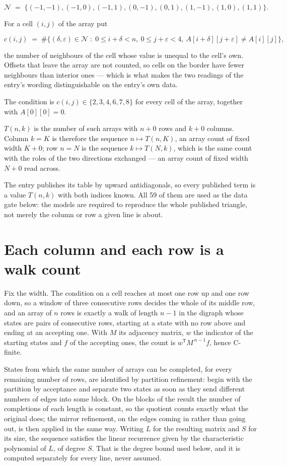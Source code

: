 \documentclass[11pt]{article}
\theoremstyle{definition}
\begin{document}
\[\mathcal{N} \;=\; \{(-1,-1), (-1,0), (-1,1), (0,-1), (0,1), (1,-1), (1,0), (1,1)\}.\]

For a cell $(i,j)$ of the array put

\[c(i,j) \;=\; \#\bigl\{(\delta,\varepsilon)\in\mathcal{N} \;:\; 0\le i+\delta<n,\ 0\le j+\varepsilon<4,\ A[i+\delta][j+\varepsilon] \neq A[i][j]\bigr\},\]

the number of neighbours of the cell whose value is unequal to the cell's own. Offsets that leave the array are not counted, so cells on the border have fewer neighbours than interior ones --- which is what makes the two readings of the entry's wording distinguishable on the entry's own data.

The condition is $c(i,j) \in \{2, 3, 4, 6, 7, 8\}$ for every cell of the array, together with $A[0][0]=0$.

$T(n,k)$ is the number of such arrays with $n + 0$ rows and $k + 0$ columns. Column $k = K$ is therefore the sequence $n \mapsto T(n,K)$, an array count of fixed width $K + 0$; row $n = N$ is the sequence $k \mapsto T(N,k)$, which is the same count with the roles of the two directions exchanged --- an array count of fixed width $N + 0$ read across.

The entry publishes its table by upward antidiagonals, so every published term is a value $T(n,k)$ with both indices known. All 59 of them are used as the data gate below: the models are required to reproduce the whole published triangle, not merely the column or row a given line is about.

\section{Each column and each row is a walk count}

Fix the width. The condition on a cell reaches at most one row up and one row down, so a window of three consecutive rows decides the whole of its middle row, and an array of $n$ rows is exactly a walk of length $n-1$ in the digraph whose states are pairs of consecutive rows, starting at a state with no row above and ending at an accepting one. With $M$ its adjacency matrix, $w$ the indicator of the starting states and $f$ of the accepting ones, the count is $w^{\mathsf T}M^{\,n-1}f$, hence C-finite.

States from which the same number of arrays can be completed, for every remaining number of rows, are identified by partition refinement: begin with the partition by acceptance and separate two states as soon as they send different numbers of edges into some block. On the blocks of the result the number of completions of each length is constant, so the quotient counts exactly what the original does; the mirror refinement, on the edges coming in rather than going out, is then applied in the same way. Writing $L$ for the resulting matrix and $S$ for its size, the sequence satisfies the linear recurrence given by the characteristic polynomial of $L$, of degree $S$. That is the degree bound used below, and it is computed separately for every line, never assumed.
\end{document}
